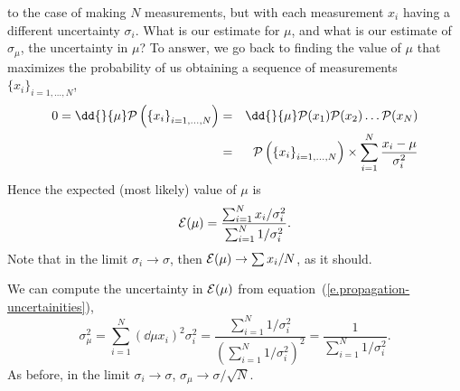  to the case of making $N$ measurements, but with each measurement $x_{i}$ having a different uncertainty $\sigma_{i}$.  What is our estimate for $\mu$, and what is our estimate of $\sigma_{\mu}$, the uncertainty in $\mu$?  To answer, we go back to finding the value of $\mu$ that maximizes the probability of us obtaining a sequence of measurements $\{x_{i}\}_{i=1,\ldots,N}$,
\begin{eqnarray*}
	0 = \dd{}{\mu}\prob\left(\left\{x_{i}\right\}_{i=1,\ldots,N}\right) &=& 
		\dd{}{\mu}\prob(x_{1})\prob(x_{2})\ldots\prob(x_{N})\\
	&=&	\prob\left(\left\{x_{i}\right\}_{i=1,\ldots,N}\right) 
		\times \sum_{i=1}^{N}\frac{x_{i}-\mu}{\sigma_{i}^{2}}
\end{eqnarray*}
Hence the expected (most likely) value of $\mu$ is
\begin{equation}
	\mathcal{E}(\mu) = \frac{\sum_{i=1}^{N} x_{i}/\sigma_{i}^{2}}{\sum_{i=1}^{N} 1/\sigma_{i}^{2}}.
\end{equation}
Note that in the limit $\sigma_{i}\to \sigma$, then $\mathcal{E}(\mu)\to \sum x_{i}/N$, as it should.

We can compute the uncertainty in $\mathcal{E}(\mu)$ 
from equation~(\ref{e.propagation-uncertainities}),
\begin{equation}
	\sigma_{\mu}^{2} = \sum_{i=1}^{N} \left(\dd{\mu}{x_{i}}\right)^{2} \sigma_{i}^{2} = \frac{\sum_{i=1}^{N}1/\sigma_{i}^{2}}{\left(\sum_{i=1}^{N}1/\sigma_{i}^{2}\right)^{2}} = \frac{1}{\sum_{i=1}^{N}1/\sigma_{i}^{2}}.
\end{equation}
As before, in the limit $\sigma_{i}\to\sigma$, $\sigma_{\mu}\to\sigma/\sqrt{N}$.

